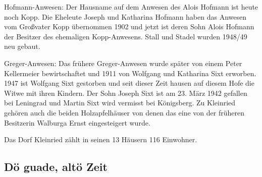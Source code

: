 \documentclass[12pt,a4pager]{book}
\begin{document}
Hofmann-Anwesen: Der Hausname auf dem Anwesen des Alois Hofmann ist heute noch
Kopp. Die Eheleute Joseph und Katharina Hofmann haben das Anwesen vom Großvater
Kopp übernommen 1902 und jetzt ist deren Sohn Alois Hofmann der Besitzer des
ehemaligen Kopp-Anwesens. Stall und Stadel wurden 1948/49 neu gebaut.

Greger-Anwesen: Das frühere Greger-Anwesen wurde später von einem Peter
Kellermeier bewirtschaftet und 1911 von Wolfgang und Katharina Sixt erworben.
1947 ist Wolfgang Sixt gestorben und seit dieser Zeit hausen auf diesem Hofe die
Witwe mit ihren Kindern. Der Sohn Joseph Sixt ist am 23. März 1942 gefallen bei
Leningrad und Martin Sixt wird vermisst bei Königsberg. Zu Kleinried gehören
auch die beiden Holzapfelhäuser von denen das eine von der früheren Besitzerin
Walburga Ernst eingesteigert wurde.

Das Dorf Kleinried zählt in seinen 13 Häusern 116 Einwohner.

\subsection{Dö guade, altö Zeit}
\end{document}
